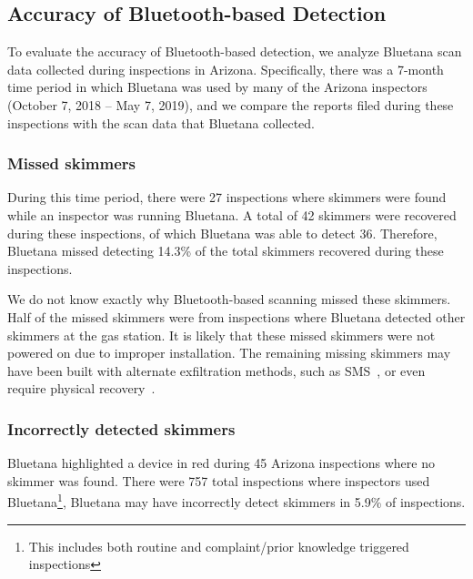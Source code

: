 

\subsection{Accuracy of Bluetooth-based Detection} %

To evaluate the accuracy of Bluetooth-based detection, we analyze Bluetana scan
data collected during inspections in Arizona. Specifically, there was a 7-month
time period in which Bluetana was used by many of the Arizona inspectors
(October 7, 2018 -- May 7, 2019), and we compare the reports filed during these
inspections with the scan data that Bluetana collected.

\subsubsection*{Missed skimmers}
\label{sec:falsenegative}


During this time period, there were 27 inspections where
skimmers were found while an inspector was running Bluetana.
%
A total of 42 skimmers were
recovered during these inspections, of which Bluetana was able to detect 36.
%
Therefore, Bluetana missed detecting 14.3\% of the total skimmers recovered during these inspections.

We do not know exactly why Bluetooth-based scanning missed these skimmers.
%
Half of the missed skimmers were from inspections where Bluetana detected other
skimmers at the gas station.
%
It is likely that these missed skimmers were not powered on due to
improper installation.
%
The remaining missing skimmers may have been built with alternate
exfiltration methods, such as SMS~\cite{scaifeoakland}, or even require physical
recovery~\cite{skimreaper2018}.

%
	

\subsubsection*{Incorrectly detected skimmers}
\label{sec:falsepositive}

Bluetana highlighted a device in red during 45 Arizona inspections where no
skimmer was found.
%
There were 757 total inspections where inspectors used
Bluetana\footnote{This includes both routine and complaint/prior knowledge
triggered inspections},  Bluetana may have incorrectly detect skimmers in 5.9\%
of inspections.

